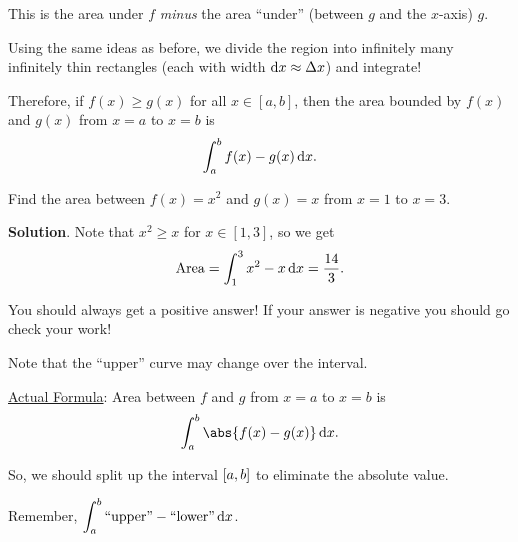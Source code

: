 This is the area under $ f $ \emph{minus} the area ``under'' (between $ g $ and the
$ x $-axis) $ g $.

Using the same ideas as before, we divide the region into infinitely many infinitely thin
rectangles (each with width $ \odif{x}\approx \Delta x $) and integrate!

Therefore, if $ f(x)\ge g(x) $ for all $ x\in[a,b] $, then the area bounded by
$ f(x) $ and $ g(x) $ from $ x=a $ to $ x=b $ is
\[ \int_{a}^{b} f(x)-g(x)\odif{x}. \]

\begin{Example}{}{}
    Find the area between $ f(x)=x^2 $ and $ g(x)=x $ from $ x=1 $ to $ x=3 $.

    \begin{center}
    \end{center}

    \textbf{Solution}. Note that $ x^2\ge x $ for $ x\in[1,3] $, so we get
    \[ \text{Area}
        =\int_{1}^{3}x^2-x\odif{x}=\frac{14}{3}. \]
\end{Example}

\begin{Remark}{}{}
    You should always get a positive answer! If your answer is negative you should go check
    your work!

    Note that the ``upper'' curve may change over the interval.
\end{Remark}

\underline{Actual Formula}: Area between $ f $ and $ g $ from $ x=a $ to $ x=b $ is
\[ \int_{a}^{b} \abs{f(x)-g(x)}\odif{x}.  \]

So, we should split up the interval $ \interval{a}{b} $ to eliminate
the absolute value.

Remember, $ \displaystyle \int_{a}^{b} \text{``upper''}-\text{``lower''}\odif{x} $.

